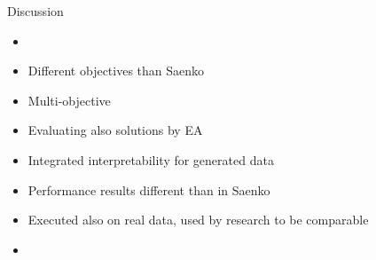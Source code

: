 \iffalse
\hl{State what you've done and what you've found
Summarize contributions (achievements and impact)
Outline open issues/directions for future work
\\\\
The final chapter of the Master's thesis is the Conclusions chapter. Here is where the writer sums up the entire project in one to two brief paragraphs. This chapter should remind the reader of the initial problem statement or hypothesis and then relate that to the results from the study. The writer should then present any conclusions reached or any new insights that arose from this work.  Finally, the writer should present the research in terms of the overall impact in the field. For example, how will the results of this study change the way a person or organization behaves or makes decisions? One caution when writing this chapter is not to merely reiterate the other portions of the thesis. Instead, the writer should strive to leave a lasting impression upon the reader, conveying with the same passion that drove the research project the importance of the work completed.
\\\\
Summary of the problem, the main findings and the discussion. Structured according to the issues in chapter 2.
Comparison with the literature presented in chapter 2: how do your results fill in, advance or contradict previously reported research?
What are the implications of your research for people working in the field that you have studies? In which direction should further research go? }
\fi

Discussion
\begin{itemize}
    \item 
    \item Different objectives than Saenko
    \item Multi-objective
    \item Evaluating also solutions by EA
    \item Integrated interpretability for generated data
    \item Performance results different than in Saenko
    \item Executed also on real data, used by research to be comparable
    \item
\end{itemize}